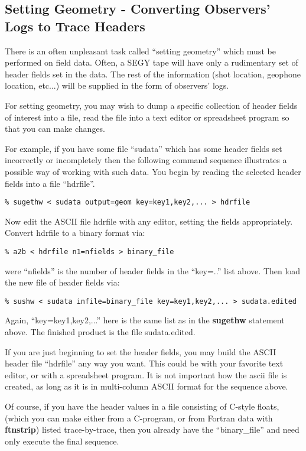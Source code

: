 {{{\subsection{Setting Geometry - Converting Observers' Logs to Trace Headers}
There is an often unpleasant task called ``setting geometry''
which must be performed on field data.
Often, a SEGY tape will have only a rudimentary set of header
fields set in the data.
The rest of the information (shot location, geophone location, etc...)
will be supplied in the form of observers' logs. 

For setting geometry, you may wish to dump a specific
collection of header fields of interest into a file,
read the file into a text editor or spreadsheet program
so that you can make changes.

For example, if you have some file ``sudata'' which has
some header fields set incorrectly or incompletely
then the following command sequence illustrates a
possible way of working with such data.
You begin by reading the selected header fields
into a file ``hdrfile''.
{\small\begin{verbatim}
% sugethw < sudata output=geom key=key1,key2,... > hdrfile 		
\end{verbatim} } \noindent
Now edit the ASCII file hdrfile with any editor, setting the fields	
appropriately. Convert hdrfile to a binary format via:		
{\small\begin{verbatim}
% a2b < hdrfile n1=nfields > binary_file				
\end{verbatim} } \noindent
were ``nfields'' is the number of header fields in the ``key=..''
list above.
Then load the new file of header fields via:					
{\small\begin{verbatim}
% sushw < sudata infile=binary_file key=key1,key2,... > sudata.edited
\end{verbatim} } \noindent
Again, ``key=key1,key2,...'' here is the same list as in the
{\bf sugethw\/} statement above.
The finished product is the file sudata.edited.

If you are just beginning to set the header fields,
you may build the ASCII header file  ``hdrfile''  any way you
want. This could be with your favorite text editor, or with
a spreadsheet program. It is not important how the ascii file is
created, as long as it is in multi-column ASCII format for
the sequence above.

Of course, if you have the header values in a file consisting
of C-style floats, (which you can make either from a C-program,
or from Fortran data with {\bf ftnstrip}) listed trace-by-trace, 
then you already have the ``binary\_file'' and need only execute the final
sequence.

}}}

